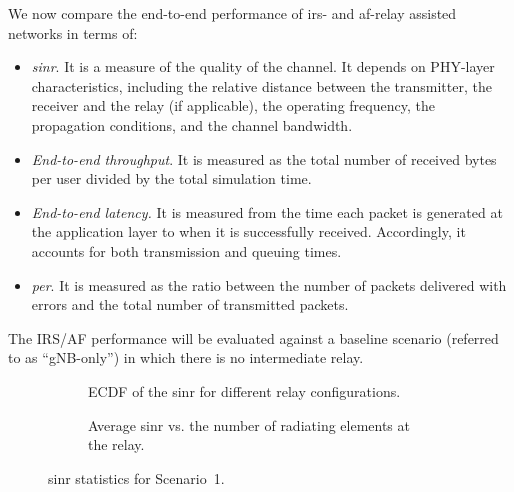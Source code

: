 We now compare the end-to-end performance of \gls{irs}- and \gls{af}-relay assisted networks in terms of:
\begin{itemize}
    \item \emph{\gls{sinr}}. It is a measure of the quality of the channel. 
    It depends on PHY-layer characteristics, including the relative distance between the transmitter, the receiver and the relay (if applicable), the operating frequency, the propagation conditions, %
    and the channel bandwidth. %
    \item \emph{End-to-end throughput}. %
     It is measured as the total number of received bytes per user divided by the total simulation time. 
    \item \emph{End-to-end latency.} It is measured from the time each packet is generated at the application layer to when it is successfully received.
  Accordingly, it accounts for both transmission and queuing times. %
 \item \emph{\gls{per}}. It is measured as the ratio between the number of packets delivered with errors and the total number of transmitted packets.
\end{itemize}
The IRS/AF performance will be evaluated against a baseline scenario (referred to as “gNB-only”) in which there is no intermediate relay.

\begin{figure}[t!]
  \centering
  \begin{subfigure}[t]{\columnwidth}
    \centering
    \setlength{}
    \setlength{}
    
    \vspace*{-3mm}
    \caption{ECDF of the \gls{sinr} for different relay configurations.\vspace{0.5cm}}
    \label{Fig:sinr_all}
  \end{subfigure}
 \hfill
  \begin{subfigure}[t]{\columnwidth}
    \centering
    \setlength{}
    \setlength{}
    
    \vspace*{-3mm}
    \caption{Average \gls{sinr} vs. the number of radiating elements at the relay.}
    \vspace*{3mm}
    \label{Fig:sinr_vs_n}
  \end{subfigure}
  \caption{\gls{sinr} statistics for Scenario~1.}
  \label{Fig:sinr}
\end{figure}

